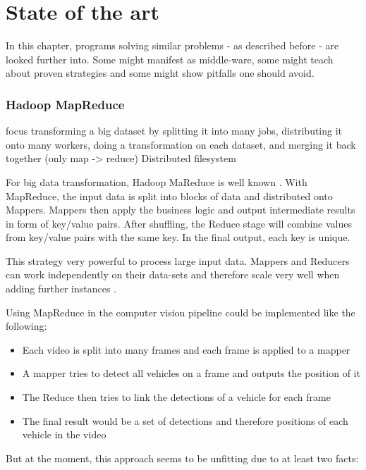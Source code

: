 \chapter{State of the art}

In this chapter, programs solving similar problems - as described before - are looked further into.
Some might manifest as middle-ware, some might teach about proven strategies and some might show pitfalls one should avoid.

\subsection{Hadoop MapReduce}
\label{hadoop}
\label{mapreduce}

focus transforming a big dataset by splitting it into many jobs, distributing it onto many workers, doing a transformation on each dataset, and merging it back together (only map -> reduce)
Distributed filesystem

For big data transformation, Hadoop MaReduce is well known .
With MapReduce, the input data is split into blocks of data and distributed onto Mappers.
Mappers then apply the business logic and output intermediate results in form of key/value pairs.
After shuffling, the Reduce stage will combine values from key/value pairs with the same key.
In the final output, each key is unique.

This strategy very powerful to process large input data.
Mappers and Reducers can work independently on their data-sets and therefore scale very well when adding further instances .

Using MapReduce in the computer vision pipeline could be implemented like the following:
\begin{itemize}
	\item Each video is split into many frames and each frame is applied to a mapper
	\item A mapper tries to detect all vehicles on a frame and outputs the position of it
	\item The Reduce then tries to link the detections of a vehicle for each frame
	\item The final result would be a set of detections and therefore positions of each vehicle in the video
\end{itemize}

But at the moment, this approach seems to be unfitting due to at least two facts:

